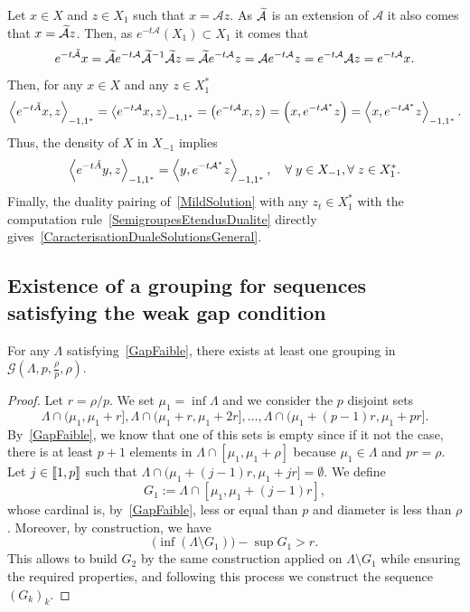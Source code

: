\documentclass[AHL,Unicode,longabstracts]{cedram}
\newcommand{\llbracket}{\mathopen{[\mkern -2.7mu[}}
\newcommand{\rrbracket}{\mathclose{]\mkern -2.7mu]}}
\newcommand{\inter}[2]{\llbracket #1,#2 \rrbracket}
\newcommand\A{\mathcal{A}}
\newcommand\As{\mathcal{A}^*}
\newcommand{\Xun}{X_1}
\newcommand{\Xuns}{X_1^*}
\newcommand{\Xmun}{X_{-1}}
\newcommand{\psX}[2]{\left(#1, #2 \right)}
\newcommand{\dualX}[2]{\left\langle #1, #2 \right\rangle_{-1,1^*}}
\let\oldtilde\tilde
\renewcommand*{\tilde}[1]{\mathchoice{\widetilde{#1}}{\widetilde{#1}}{\oldtilde{#1}}{\oldtilde{#1}}}\let\oldexists\exists
\renewcommand*{\exists}{\mathrel{\oldexists}}
\let\oldforall\forall
\renewcommand*{\forall}{\mathrel{\oldforall}}
\begin{document}
Let $x \in X$ and $z \in \Xun$ such that $x= \A z$. As $\tilde{\A}$ is an extension of $\A$ it also comes that $x = \tilde{\A}z$. Then, as $e^{-t \A} (\Xun) \subset \Xun$ it comes that
\[
e^{-t \tilde{\A}}x = \tilde{\A} e^{-t \A} \tilde{\A}^{-1} \tilde{\A} z = \tilde{\A} e^{-t \A} z = \A e^{-t \A} z = e^{-t \A} \A z = e^{-t \A}x.
\]
Then, for any $x \in X$ and any $z \in \Xuns$
\[
\dualX{e^{-t \tilde{A}} x }{z} = \dualX{e^{-t\A} x}{z} = \psX{e^{-t\A}x}{z} = \psX{x}{e^{-t \As} z} = \dualX{x}{e^{-t \As}z}.
\]
Thus, the density of $X$ in $\Xmun$ implies
\begin{equation}\label{SemigroupesEtendusDualite}
\dualX{e^{-t \tilde{A}} y }{z} = \dualX{y}{e^{-t \As}z}, \quad \forall y \in \Xmun, \forall z \in \Xuns.
\end{equation}
Finally, the duality pairing of~\eqref{MildSolution} with any $z_t \in \Xuns$ with the computation rule~\eqref{SemigroupesEtendusDualite} directly gives~\eqref{CaracterisationDualeSolutionsGeneral}.


\subsection{Existence of a grouping for sequences satisfying the weak gap condition}

\begin{prop}\label{Prop:Groupements}
For any $\Lambda$ satisfying~\eqref{GapFaible}, there exists at least one grouping in $\mathcal{G} \left(\Lambda, p,\frac{\rho}{p},\rho \right)$.
\end{prop}

\begin{proof}
Let $r=\rho/p$. We set $\mu_1=\inf \Lambda$ and we consider the $p$ disjoint sets
\[
\Lambda\cap (\mu_1,\mu_1+r], \Lambda\cap (\mu_1+r,\mu_1+2r], \dotsc, \Lambda\cap (\mu_1+(p-1)r,\mu_1+pr].
\]
By~\eqref{GapFaible}, we know that one of this sets is empty since if it not the case, there is at least $p+1$ elements in $\Lambda\cap [\mu_1,\mu_1+\rho]$ because $\mu_1\in \Lambda$ and $pr=\rho$. Let $j\in \inter{1}{p}$ such that $\Lambda\cap (\mu_1+(j-1)r,\mu_1+jr]= \emptyset$. We define
\[
G_1:=\Lambda\cap [\mu_1, \mu_1+(j-1)r],
\]
whose cardinal is, by~\eqref{GapFaible}, less or equal than $p$ and diameter is less than $\rho$. Moreover, by construction, we have
\[
\big(\inf (\Lambda\setminus G_1) \big) - \sup G_1 > r.
\]
This allows to build $G_2$ by the same construction applied on $\Lambda\setminus G_1$ while ensuring the required properties, and following this process we construct the sequence $(G_k)_k$.
\end{proof}
\end{document}
